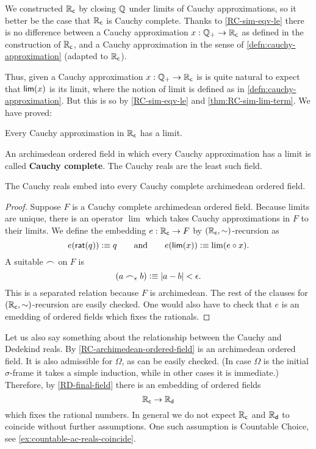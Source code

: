 We constructed $\mathbb{R}_\mathsf{c}$ by closing $\mathbb{Q}$ under limits of Cauchy approximations, so it better
be the case that $\mathbb{R}_\mathsf{c}$ is Cauchy complete. Thanks to \autoref{RC-sim-eqv-le} there is no
difference between a Cauchy approximation $x : \mathbb{Q}_{+} \to \mathbb{R}_\mathsf{c}$ as defined in the construction
of $\mathbb{R}_\mathsf{c}$, and a Cauchy approximation in the sense of \autoref{defn:cauchy-approximation}
(adapted to $\mathbb{R}_\mathsf{c}$).

Thus, given a Cauchy approximation $x : \mathbb{Q}_{+} \to \mathbb{R}_\mathsf{c}$ is is quite natural to expect that
$\mathsf{lim}(x)$ is its limit, where the notion of limit is defined as in
\autoref{defn:cauchy-approximation}. But this is so by \autoref{RC-sim-eqv-le} and
\autoref{thm:RC-sim-lim-term}. We have proved:

\begin{thm}
  Every Cauchy approximation in $\mathbb{R}_\mathsf{c}$ has a limit.
\end{thm}

An archimedean ordered field in which every Cauchy approximation has a limit is called
\textbf{Cauchy complete}. The Cauchy reals are the least such field.

\begin{thm} \label{RC-initial-Cauchy-complete}
  The Cauchy reals embed into every Cauchy complete archimedean ordered field.
\end{thm}

\begin{proof}
  Suppose $F$ is a Cauchy complete archimedean ordered field. Because limits are unique,
  there is an operator $\lim$ which takes Cauchy approximations in $F$ to their limits. We
  define the embedding $e : \mathbb{R}_\mathsf{c} \to F$ by $(\mathbb{R}_\mathsf{c}, {\sim})$-recursion as
  \begin{equation*}
    e(\mathsf{rat}(q)) \vcentcolon\equiv q
    \qquad\text{and}\qquad
    e(\mathsf{lim}(x)) \vcentcolon\equiv \lim (e \circ x).
  \end{equation*}
  A suitable $\frown$ on $F$ is
  \begin{equation*}
    (a \frown_\epsilon b) \vcentcolon\equiv |a - b| < \epsilon.
  \end{equation*}
  This is a separated relation because $F$ is archimedean. The rest of the clauses for
  $(\mathbb{R}_\mathsf{c}, {\sim})$-recursion are easily checked. One would also have to check that $e$ is
  an emedding of ordered fields which fixes the rationals.
\end{proof}

\medskip

Let us also say something about the relationship between the Cauchy and Dedekind reals. By
\autoref{RC-archimedean-ordered-field} is an archimedean ordered field. It is also
admissible for $\Omega$, as can be easily checked. (In case $\Omega$ is the initial
$\sigma$-frame it takes a simple induction, while in other cases it is immediate.)
Therefore, by \autoref{RD-final-field} there is an embedding of ordered fields
%
\begin{equation*}
  \mathbb{R}_\mathsf{c} \to \mathbb{R}_\mathsf{d}
\end{equation*}
%
which fixes the rational numbers. In general we do not expect $\mathbb{R}_\mathsf{c}$ and $\mathbb{R}_\mathsf{d}$ to coincide
without further assumptions. One such assumption is Countable Choice, see
\autoref{ex:countable-ac-reals-coincide}.


